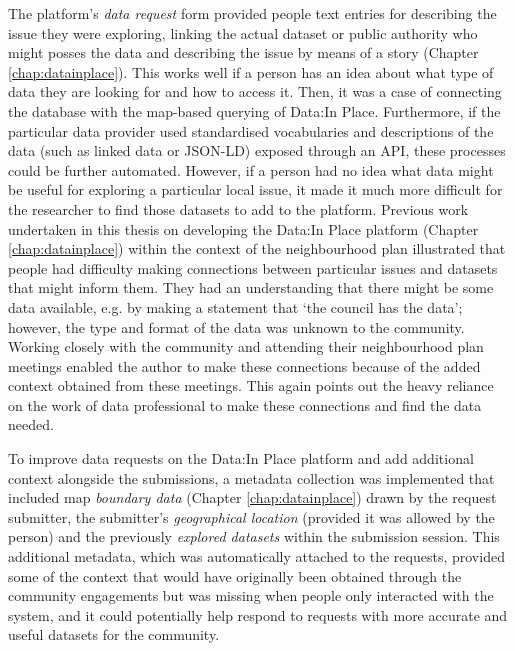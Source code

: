 The platform's \textit{data request} form provided people text entries for describing the issue they were exploring, linking the actual dataset or public authority who might posses the data and describing the issue by means of a story (Chapter \ref{chap:datainplace}). This works well if a person has an idea about what type of data they are looking for and how to access it. Then, it was a case of connecting the database with the map-based querying of Data:In Place. Furthermore, if the particular data provider used standardised vocabularies and descriptions of the data (such as linked data or JSON-LD) exposed through an API, these processes could be further automated. However, if a person had no idea what data might be useful for exploring a particular local issue, it made it much more difficult for the researcher to find those datasets to add to the platform. Previous work undertaken in this thesis on developing the Data:In Place platform (Chapter \ref{chap:datainplace}) within the context of the neighbourhood plan illustrated that people had difficulty making connections between particular issues and datasets that might inform them. They had an understanding that there might be some data available, e.g. by making a statement that `the council has the data'; however, the type and format of the data was unknown to the community. Working closely with the community and attending their neighbourhood plan meetings enabled the author to make these connections because of the added context obtained from these meetings. This again points out the heavy reliance on the work of data professional to make these connections and find the data needed.

To improve data requests on the Data:In Place platform and add additional context alongside the submissions, a metadata collection was implemented that included map \textit{boundary data} (Chapter \ref{chap:datainplace}) drawn by the request submitter, the submitter's \textit{geographical location} (provided it was allowed by the person) and the previously \textit{explored datasets} within the submission session. This additional metadata, which was automatically attached to the requests, provided some of the context that would have originally been obtained through the community engagements but was missing when people only interacted with the system, and it could potentially help respond to requests with more accurate and useful datasets for the community.


